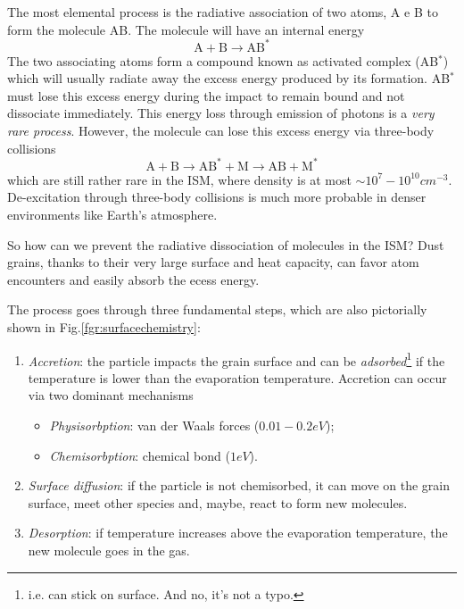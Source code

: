 The most elemental process is the radiative association of two atoms, A e B to form the molecule AB. The molecule will have an internal energy
\begin{equation*}
    \text{A}+\text{B}\to \text{AB}^{*}
\end{equation*}
The two associating atoms form a compound known as activated complex (AB$^{*}$) which will usually radiate away the excess energy produced by its formation. AB$^{*}$ must lose this excess energy during the impact to remain bound and not dissociate immediately. This energy loss through emission of photons is a \emph{very rare process}. However, the molecule can lose this excess energy via three-body collisions
\begin{equation*}
    \text{A}+\text{B}\to \text{AB}^{*} + \text{M} \to \text{AB} + \text{M}^{*}
\end{equation*}
which are still rather rare in the ISM, where density is at most $\sim 10^{7}-10^{10}\unit{cm}^{-3}$. De-excitation through three-body collisions is much more probable in denser environments like Earth's atmosphere.
\par So how can we prevent the radiative dissociation of molecules in the ISM? Dust grains, thanks to their very large surface and heat capacity, can favor atom encounters and easily absorb the ecess energy.
\par The process goes through three fundamental steps, which are also pictorially shown in Fig.\ref{fgr:surfacechemistry}:
\begin{enumerate}
    \item \emph{Accretion}: the particle impacts the grain surface and can be \emph{adsorbed}\footnote{i.e. can stick on surface. And no, it's not a typo.} if the temperature is lower than the evaporation temperature. Accretion can occur via two dominant mechanisms
    \begin{itemize}
        \item \emph{Physisorbption}: van der Waals forces ($0.01-0.2 \unit{eV}$);
        \item \emph{Chemisorbption}: chemical bond ($1\unit{eV}$).
    \end{itemize}
    \item \emph{Surface diffusion}: if the particle is not chemisorbed, it can move on the grain surface, meet other species and, maybe, react to form new molecules.
    \item \emph{Desorption}: if temperature increases above the evaporation temperature, the new molecule goes in the gas.
\end{enumerate}

